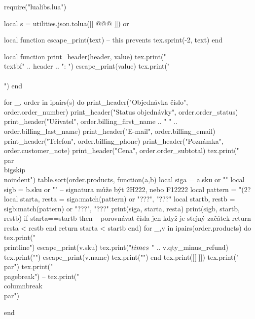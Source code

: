 \documentclass[landscape,a4page]{article}
\begin{document}
\columnseprule=0.3pt
\columnsep=20pt
\parindent=0pt
\parskip=2pt
\newcommand\printline[2]{\parbox{.2\linewidth}{#1}~\parbox{.7\linewidth}{#2}\\}

\begin{multicols*}{3}
  \sloppy

\begin{luacode*}
require("lualibs.lua")

local s =  utilities.json.tolua([[
@@@
]]) or {}



local function escape_print(text)
  -- this prevents
  tex.sprint(-2, text)
end

local function print_header(header, value)
  tex.print("\\textbf{" .. header .. ":} ")
  escape_print(value)
  tex.print("\\\\")
end


for _, order in ipairs(s) do
  print_header("Objednávka číslo", order.order_number)
  print_header("Status objednávky", order.order_status)
  print_header("Uživatel", order.billing_first_name .. " " .. order.billing_last_name)
  print_header("E-mail", order.billing_email)
  print_header("Telefon", order.billing_phone)
  print_header("Poznámka", order.customer_note)
  print_header("Cena", order.order_subtotal)
  tex.print("\\par\\bigskip\\noindent")
  table.sort(order.products, function(a,b)
    local siga = a.sku or ""
    local sigb = b.sku or ""
    -- signatura může být 2H222, nebo F12222
    local pattern = "(2?%
    local starta, resta = siga:match(pattern) or "???", "???"
    local startb, restb = sigb:match(pattern) or "???", "???"
    print(siga, starta, resta)
    print(sigb, startb, restb)
    if starta==startb then
      -- porovnávat čísla jen když je stejný začátek
      return resta < restb 
    end
    return starta < startb
  end)
  for _,v in ipairs(order.products) do
    tex.print("\\printline{")
    escape_print(v.sku)
    tex.print("$\\times$ " .. v.qty_minus_refund)
    tex.print("}{")
    escape_print(v.name)
  tex.print("}")
  end
  tex.print([[
  \vfill
  \null
  ]])
  tex.print("\\par")
  tex.print("\\pagebreak")
  -- tex.print("\\columnbreak\\par")


end



\end{luacode*}
\end{multicols*}
\end{document}
